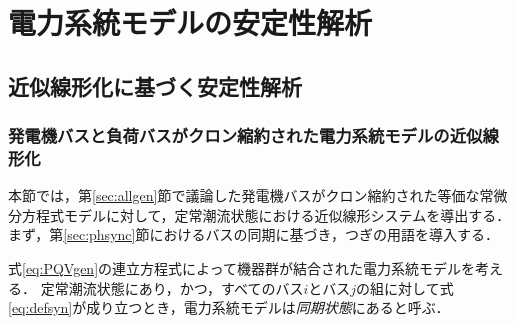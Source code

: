 \documentclass[a4j,10pt,oneside,openany,dvipdfmx]{jsbook}
\begin{document}
%
%
%
%


\chapter{電力系統モデルの安定性解析}\label{sec:staana}

\section{近似線形化に基づく安定性解析}\label{sec:stalin}

\subsection{発電機バスと負荷バスがクロン縮約された電力系統モデルの近似線形化}

本節では，第\ref{sec:allgen}節で議論した発電機バスがクロン縮約された等価な常微分方程式モデルに対して，定常潮流状態における近似線形システムを導出する．
まず，第\ref{sec:phsync}節におけるバスの同期に基づき，つぎの用語を導入する．

\begin{definition}\label{def:syncall}
式\eqref{eq:PQVgen}の連立方程式によって機器群が結合された電力系統モデルを考える．
定常潮流状態にあり，かつ，すべてのバス$i$とバス$j$の組に対して式\eqref{eq:defsyn}が成り立つとき，電力系統モデルは\emph{同期状態}にあると呼ぶ．
\end{definition}
\end{document}
